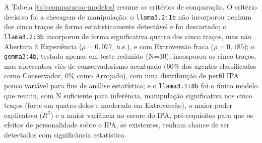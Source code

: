 A Tabela \ref{tab:comparacao-modelos} resume os critérios de comparação.
O critério decisivo foi a checagem de manipulação: o \texttt{llama3.2:1b}
não incorporou nenhum dos cinco traços de forma estatisticamente
detectável e foi descartado; o \texttt{llama3.2:3b} incorporou de forma
significativa quatro dos cinco traços, mas não Abertura à Experiência
($\rho=0{,}077$, n.s.), e com Extroversão fraca ($\rho=0{,}185$); o \texttt{gemma3:4b}, testado apenas em teste reduzido
(N=30), incorporou os cinco traços, mas apresentou viés de
conservadorismo acentuado (60\% dos agentes classificados como
Conservador, 0\% como Arrojado), com uma distribuição de perfil IPA pouco
variável para fins de análise estatística; e o \texttt{llama3.1:8b} foi o
único modelo que reuniu, com N suficiente para inferência, manipulação
significativa nos cinco traços (forte em quatro deles e moderada em
Extroversão), o maior poder explicativo ($R^2$) e a maior variância no
escore do IPA, pré-requisitos para que os efeitos de
personalidade sobre o IPA, se existentes, tenham chance de ser detectados
com significância estatística.

